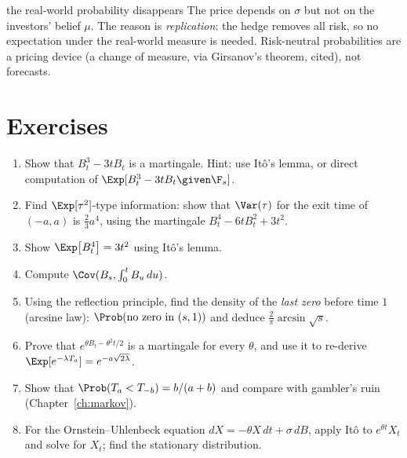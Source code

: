 \begin{nuance}{the real-world probability disappears}
The price depends on $\sigma$ but not on the investors' belief $\mu$. The reason is
\emph{replication}: the hedge removes all risk, so no expectation under the real-world measure
is needed. Risk-neutral probabilities are a pricing device (a change of measure, via
Girsanov's theorem, cited), not forecasts.
\end{nuance}

\section*{Exercises}

\begin{enumerate}
\item Show that $B_t^3-3tB_t$ is a martingale. Hint: use It\^o's lemma, or direct computation of
$\Exp[B_t^3-3tB_t\given\F_s]$.
\item Find $\Exp[\tau^2]$-type information: show that $\Var(\tau)$ for the exit time of
$(-a,a)$ is $\tfrac23a^4$, using the martingale $B_t^4-6tB_t^2+3t^2$.
\item Show $\Exp\bigl[B_t^4\bigr]=3t^2$ using It\^o's lemma.
\item Compute $\Cov(B_s,\int_0^tB_u\,du)$.
\item Using the reflection principle, find the density of the \emph{last zero} before time
$1$ (arcsine law): $\Prob(\text{no zero in }(s,1))$ and deduce $\frac2\pi\arcsin\sqrt s$.
\item Prove that $e^{\theta B_t-\theta^2t/2}$ is a martingale for every $\theta$, and use it to
re-derive $\Exp[e^{-\lambda T_a}]=e^{-a\sqrt{2\lambda}}$.
\item Show that $\Prob(T_a<T_{-b})=b/(a+b)$ and compare with gambler's ruin
(Chapter~\ref{ch:markov}).
\item For the Ornstein--Uhlenbeck equation $dX=-\theta X\,dt+\sigma\,dB$, apply It\^o to
$e^{\theta t}X_t$ and solve for $X_t$; find the stationary distribution.
\end{enumerate}
